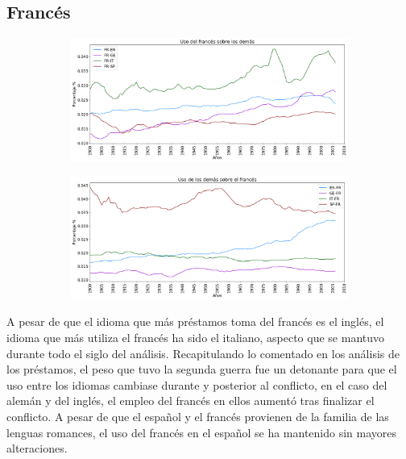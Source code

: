 \subsection{Francés}

\begin{figure}[h!]
	
	\begin{subfigure}{}
		\centering
		\includegraphics[scale=.38]{Cap_3/PF1_S2_FR.png}
		\caption{}
		\label{fig:ST_FR_a}
	\end{subfigure}
	
	\begin{subfigure}{}
		\centering
		\includegraphics[scale=.38]{Cap_3/PF2_S2_FR.png}
		\caption{}
		\label{fig:ST_FR_b}
	\end{subfigure}
	
\end{figure}

A pesar de que el idioma que más préstamos toma del francés es el inglés,  el idioma que más utiliza el francés ha sido el italiano,  aspecto que se mantuvo durante todo el siglo del análisis.  Recapitulando lo comentado en los análisis de los préstamos,  el peso que tuvo la segunda guerra fue un detonante para que el uso entre los idiomas cambiase durante y posterior al conflicto,  en el caso del alemán y del inglés,  el empleo del francés en ellos aumentó tras finalizar el conflicto.  A pesar de que el español y el francés provienen de la familia de las lenguas romances,  el uso del francés en el español se ha mantenido sin mayores alteraciones.

